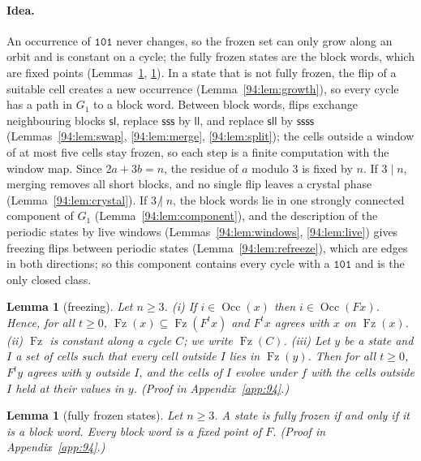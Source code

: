 \documentclass[10pt,a4paper]{article}
\newtheorem{lemma}[theorem]{Lemma}
\newcommand{\Gone}{G_1}                       %
\newcommand{\code}[1]{\mathtt{#1}}            %
\newcommand{\ndiv}{\mathrel{\not|}}           %
\newcommand{\Occ}{\operatorname{Occ}}         %
\newcommand{\Fz}{\operatorname{Fz}}           %
\begin{document}
\paragraph{Idea.}
An occurrence of $\code{101}$ never changes, so the frozen set can only grow along an orbit and is constant on a
cycle; the fully frozen states are the block words, which are fixed points
(Lemmas~\ref{94:lem:freeze}, \ref{94:lem:block}). In a state that is not fully frozen, the flip of a suitable cell
creates a new occurrence (Lemma~\ref{94:lem:growth}), so every cycle has a path in $\Gone$ to a block word.
Between block words, flips exchange neighbouring blocks $\mathsf{s}\mathsf{l}$, replace $\mathsf{sss}$ by
$\mathsf{ll}$, and replace $\mathsf{sll}$ by $\mathsf{ssss}$
(Lemmas~\ref{94:lem:swap}, \ref{94:lem:merge}, \ref{94:lem:split}); the cells outside a window of at most five
cells stay frozen, so each step is a finite computation with the window map. Since $2a+3b=n$, the residue of $a$
modulo $3$ is fixed by $n$. If $3\mid n$, merging removes all short blocks, and no single flip leaves a crystal
phase (Lemma~\ref{94:lem:crystal}). If $3\ndiv n$, the block words lie in one strongly connected component of
$\Gone$ (Lemma~\ref{94:lem:component}), and the description of the periodic states by live windows
(Lemmas~\ref{94:lem:windows}, \ref{94:lem:live}) gives freezing flips between periodic states
(Lemma~\ref{94:lem:refreeze}), which are edges in both directions; so this component contains every cycle with a
$\code{101}$ and is the only closed class.

\begin{lemma}[freezing]\label{94:lem:freeze}
Let $n\ge3$.
\textup{(i)} If $i\in\Occ(x)$ then $i\in\Occ(Fx)$. Hence, for all $t\ge0$, $\Fz(x)\subseteq\Fz(F^tx)$ and $F^tx$
agrees with $x$ on $\Fz(x)$.
\textup{(ii)} $\Fz$ is constant along a cycle $C$; we write $\Fz(C)$.
\textup{(iii)} Let $y$ be a state and $I$ a set of cells such that every cell outside $I$ lies in $\Fz(y)$. Then
for all $t\ge0$, $F^ty$ agrees with $y$ outside $I$, and the cells of $I$ evolve under $f$ with the cells outside
$I$ held at their values in $y$. (Proof in Appendix~\ref{app:94}.)
\end{lemma}

\begin{lemma}[fully frozen states]\label{94:lem:block}
Let $n\ge3$. A state is fully frozen if and only if it is a block word. Every block word is a fixed point of $F$.
(Proof in Appendix~\ref{app:94}.)
\end{lemma}
\end{document}
